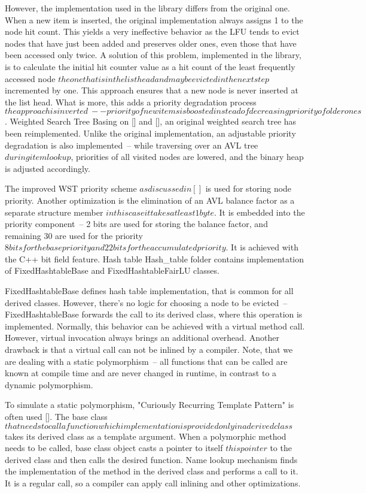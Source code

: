 However, the implementation used in the library differs from the original one. When a new item is inserted, the original implementation always assigns 1 to the node hit count. This yields a very ineffective behavior as the LFU tends to evict nodes that have just been added and preserves older ones, even those that have been accessed only twice. A solution of this problem, implemented in the library, is to calculate the initial hit counter value as a hit count of the least frequently accessed node \(the one that is in the list head and may be evicted in the next step\) incremented by one. This approach ensures that a new node is never inserted at the list head. What is more, this adds a priority degradation process \(the approach is inverted~-- priority of new items is boosted instead of decreasing priority of older ones\).
Weighted Search Tree
Basing on [] and [], an original weighted search tree has been reimplemented. Unlike the original implementation, an adjustable priority degradation is also implemented~-- while traversing over an AVL tree \(during item lookup\), priorities of all visited nodes are lowered, and the binary heap is adjusted accordingly.

The improved WST priority scheme \(as discussed in []\) is used for storing node priority. Another optimization is the elimination of an AVL balance factor as a separate structure member \(in this case it takes at least 1 byte\). It is embedded into the priority component~-- 2 bits are used for storing the balance factor, and remaining 30 are used for the priority \(8 bits for the base priority and 22 bits for the accumulated priority\). It is achieved with the C++ bit field feature.
Hash table
Hash\_table folder contains implementation of FixedHashtableBase and FixedHashtableFairLU classes.

FixedHashtableBase defines hash table implementation, that is common for all derived classes. However, there’s no logic for choosing a node to be evicted~-- FixedHashtableBase forwards the call to its derived class, where this operation is implemented. Normally, this behavior can be achieved with a virtual method call. However, virtual invocation always brings an additional overhead. Another drawback is that a virtual call can not be inlined by a compiler. Note, that we are dealing with a static polymorphism~-- all functions that can be called are known at compile time and are never changed in runtime, in contrast to a dynamic polymorphism.

To simulate a static polymorphism, "Curiously Recurring Template Pattern" is often used []. The base class \(that needs to call a function which implementation is provided only in a derived class\) takes its derived class as a template argument. When a polymorphic method needs to be called, base class object casts a pointer to itself \(this pointer\) to the derived class and then calls the desired function. Name lookup mechanism finds the implementation of the method in the derived class and performs a call to it. It is a regular call, so a compiler can apply call inlining and other optimizations.

